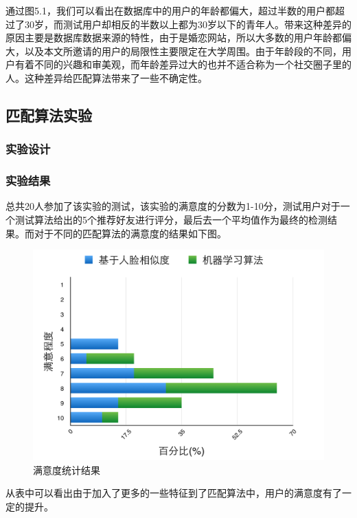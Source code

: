 通过图5.1，我们可以看出在数据库中的用户的年龄都偏大，超过半数的用户都超过了30岁，而测试用户却相反的半数以上都为30岁以下的青年人。带来这种差异的原因主要是数据库数据来源的特性，由于是婚恋网站，所以大多数的用户年龄都偏大，以及本文所邀请的用户的局限性主要限定在大学周围。由于年龄段的不同，用户有着不同的兴趣和审美观，而年龄差异过大的也并不适合称为一个社交圈子里的人。这种差异给匹配算法带来了一些不确定性。


\subsection{匹配算法实验}
\subsubsection{实验设计}

\subsubsection{实验结果}
总共20人参加了该实验的测试，该实验的满意度的分数为1-10分，测试用户对于一个测试算法给出的5个推荐好友进行评分，最后去一个平均值作为最终的检测结果。而对于不同的匹配算法的满意度的结果如下图。
\begin{figure}[h]
\begin{minipage}[t]{1\linewidth} 
\centering
\includegraphics[width=\textwidth]{img/chap5/exp2.png}
\caption{满意度统计结果\label{instagram}}
\end{minipage}
\end{figure}
从表中可以看出由于加入了更多的一些特征到了匹配算法中，用户的满意度有了一定的提升。
